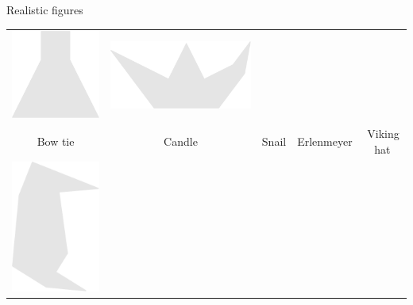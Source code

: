 \documentclass[14pt]{beamer}
\begin{document}
\begin{frame}{Realistic figures}
\begin{center}
{\begin{tabular}{ccccc}
                \includegraphics[scale=0.21]{figures/figure026g.pdf} &
                \includegraphics[scale=0.21]{figures/figure026a.pdf} \\
                Bow tie & Candle & Snail & Erlenmeyer & \;\,Viking hat\\[2ex]
                \includegraphics[scale=0.21]{figures/figure026q.pdf}\!\!\!\! &

\end{tabular}}
\end{center}
\end{frame}
\end{document}
